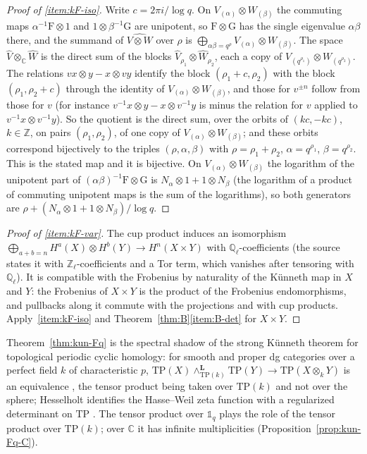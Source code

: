 \documentclass[11pt]{amsart}
\theoremstyle{plain}
\theoremstyle{definition}
\theoremstyle{remark}
\numberwithin{equation}{section}
\newcommand{\C}{\mathbb{C}}
\newcommand{\Q}{\mathbb{Q}}
\newcommand{\Z}{\mathbb{Z}}
\begin{document}
\begin{proof}[Proof of \ref{item:kF-iso}]
Write $c=2\pi i/\log q$. On $V_{(\alpha)}\otimes W_{(\beta)}$ the commuting maps
$\alpha^{-1}\mathrm{F}\otimes1$ and $1\otimes\beta^{-1}\mathrm{G}$
are unipotent, so $\mathrm{F}\otimes\mathrm{G}$ has the single
eigenvalue $\alpha\beta$ there, and the summand of
$\widehat{V\otimes W}$ over $\rho$ is
$\bigoplus_{\alpha\beta=q^\rho}V_{(\alpha)}\otimes W_{(\beta)}$. The
space $\widehat V\otimes_\C\widehat W$ is the direct sum of the blocks
$\widehat V_{\rho_1}\otimes\widehat W_{\rho_2}$, each a copy of
$V_{(q^{\rho_1})}\otimes W_{(q^{\rho_2})}$. The relations
$vx\otimes y-x\otimes vy$ identify the block $(\rho_1+c,\rho_2)$ with
the block $(\rho_1,\rho_2+c)$ through the identity of
$V_{(\alpha)}\otimes W_{(\beta)}$, and those for $v^{\pm n}$ follow from
those for $v$ (for instance $v^{-1}x\otimes y-x\otimes v^{-1}y$ is minus
the relation for $v$ applied to $v^{-1}x\otimes v^{-1}y$). So the
quotient is the direct sum, over the orbits of $(k c,-k c)$,
$k\in\Z$, on pairs $(\rho_1,\rho_2)$, of one copy of
$V_{(\alpha)}\otimes W_{(\beta)}$; and these orbits correspond
bijectively to the triples $(\rho,\alpha,\beta)$ with $\rho=\rho_1+
\rho_2$, $\alpha=q^{\rho_1}$, $\beta=q^{\rho_2}$. This is the stated map
and it is bijective. On $V_{(\alpha)}\otimes W_{(\beta)}$ the logarithm
of the unipotent part of $(\alpha\beta)^{-1}\mathrm{F}\otimes\mathrm{G}$
is $N_\alpha\otimes1+1\otimes N_\beta$ (the logarithm of a product of
commuting unipotent maps is the sum of the logarithms), so both
generators are $\rho+(N_\alpha\otimes1+1\otimes N_\beta)/\log q$.
\end{proof}

\begin{proof}[Proof of \ref{item:kF-var}]
The cup product induces an isomorphism $\bigoplus_{a+b=n}
H^a(X)\otimes H^b(Y)\to H^n(X\times Y)$ with $\Q_\ell$-coefficients
\cite[Theorem~22.4, p.~136]{MilneLEC2013} (the source states it with
$\Z_\ell$-coefficients and a Tor term, which vanishes after tensoring
with $\Q_\ell$). It is compatible with the Frobenius by naturality of
the K\"unneth map in $X$ and $Y$: the Frobenius of $X\times Y$ is the
product of the Frobenius endomorphisms, and pullbacks along it commute
with the projections and with cup products.
 Apply~\ref{item:kF-iso} and
Theorem~\ref{thm:B}\ref{item:B-det} for $X\times Y$.
\end{proof}

Theorem~\ref{thm:kun-Fq} is the spectral shadow of the strong
K\"unneth theorem for topological periodic cyclic homology: for smooth
and proper dg categories over a perfect field $k$ of characteristic
$p$, $\mathrm{TP}(X)\wedge^{\mathbf L}_{\mathrm{TP}(k)}\mathrm{TP}(Y)
\to\mathrm{TP}(X\otimes_kY)$ is an equivalence
\cite[Theorem~A, pp.~2--3]{BlumbergMandell2017StrongKunneth}, the
tensor product being taken over $\mathrm{TP}(k)$ and not over the
sphere; Hesselholt identifies the Hasse--Weil zeta function with a
regularized determinant on $\mathrm{TP}$
\cite[Theorem~A and footnote~1, p.~2]{Hesselholt2016THHZeta}. The tensor
product over $\mathbb 1_q$ plays the role of the tensor product over
$\mathrm{TP}(k)$; over $\C$ it has infinite multiplicities
(Proposition~\ref{prop:kun-Fq-C}).
\end{document}
